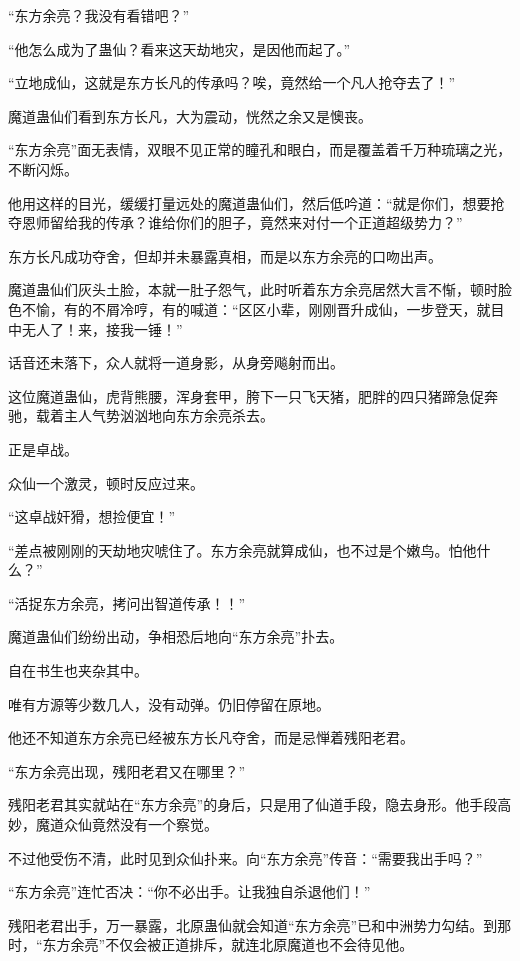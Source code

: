 
\begin{this_body}

“东方余亮？我没有看错吧？”

“他怎么成为了蛊仙？看来这天劫地灾，是因他而起了。”

“立地成仙，这就是东方长凡的传承吗？唉，竟然给一个凡人抢夺去了！”

魔道蛊仙们看到东方长凡，大为震动，恍然之余又是懊丧。

“东方余亮”面无表情，双眼不见正常的瞳孔和眼白，而是覆盖着千万种琉璃之光，不断闪烁。

他用这样的目光，缓缓打量远处的魔道蛊仙们，然后低吟道：“就是你们，想要抢夺恩师留给我的传承？谁给你们的胆子，竟然来对付一个正道超级势力？”

东方长凡成功夺舍，但却并未暴露真相，而是以东方余亮的口吻出声。

魔道蛊仙们灰头土脸，本就一肚子怨气，此时听着东方余亮居然大言不惭，顿时脸色不愉，有的不屑冷哼，有的喊道：“区区小辈，刚刚晋升成仙，一步登天，就目中无人了！来，接我一锤！”

话音还未落下，众人就将一道身影，从身旁飚射而出。

这位魔道蛊仙，虎背熊腰，浑身套甲，胯下一只飞天猪，肥胖的四只猪蹄急促奔驰，载着主人气势汹汹地向东方余亮杀去。

正是卓战。

众仙一个激灵，顿时反应过来。

“这卓战奸猾，想捡便宜！”

“差点被刚刚的天劫地灾唬住了。东方余亮就算成仙，也不过是个嫩鸟。怕他什么？”

“活捉东方余亮，拷问出智道传承！！”

魔道蛊仙们纷纷出动，争相恐后地向“东方余亮”扑去。

自在书生也夹杂其中。

唯有方源等少数几人，没有动弹。仍旧停留在原地。

他还不知道东方余亮已经被东方长凡夺舍，而是忌惮着残阳老君。

“东方余亮出现，残阳老君又在哪里？”

残阳老君其实就站在“东方余亮”的身后，只是用了仙道手段，隐去身形。他手段高妙，魔道众仙竟然没有一个察觉。

不过他受伤不清，此时见到众仙扑来。向“东方余亮”传音：“需要我出手吗？”

“东方余亮”连忙否决：“你不必出手。让我独自杀退他们！”

残阳老君出手，万一暴露，北原蛊仙就会知道“东方余亮”已和中洲势力勾结。到那时，“东方余亮”不仅会被正道排斥，就连北原魔道也不会待见他。


\end{this_body}

